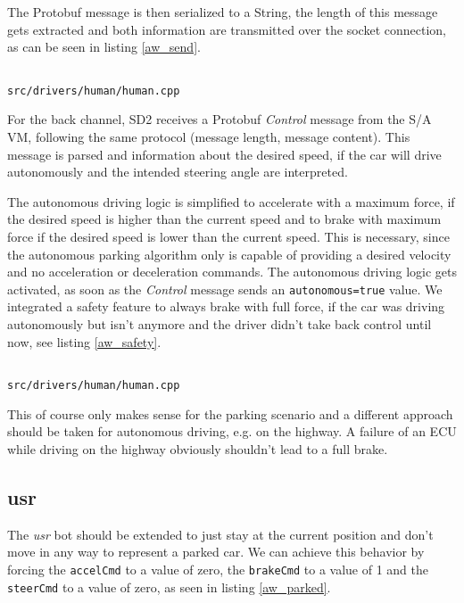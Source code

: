 \documentclass[paper=a4, fontsize=11pt]{scrreprt}
\begin{document}
The Protobuf message is then serialized to a String,
the length of this message gets extracted
and both information are transmitted over the socket connection,
as can be seen in listing \ref{aw_send}.

\begin{listing}[ht]
  \inputminted[firstline=352,linenos=true,lastline=363,gobble=4]{c++}{../../../simulators/speed-dreams/src/drivers/human/human.cpp}
  \caption{\texttt{src/drivers/human/human.cpp}}\label{aw_send}
\end{listing}

For the back channel, SD2 receives a Protobuf \textit{Control} message from the S/A VM,
following the same protocol (message length, message content).
This message is parsed and information about the desired speed,
if the car will drive autonomously and the intended steering angle are interpreted.

The autonomous driving logic is simplified to accelerate with a maximum force,
if the desired speed is higher than the current speed
and to brake with maximum force if the desired speed is lower than the current speed.
This is necessary,
since the autonomous parking algorithm only is capable of providing a desired velocity
and no acceleration or deceleration commands.
The autonomous driving logic gets activated,
as soon as the \textit{Control} message sends an \texttt{autonomous=true} value.
We integrated a safety feature to always brake with full force,
if the car was driving autonomously but isn't anymore
and the driver didn't take back control until now, see listing \ref{aw_safety}.

\begin{listing}[ht]
  \inputminted[firstline=422,linenos=true,lastline=426,gobble=6]{c++}{../../../simulators/speed-dreams/src/drivers/human/human.cpp}
  \caption{\texttt{src/drivers/human/human.cpp}}\label{aw_safety}
\end{listing}

This of course only makes sense for the parking scenario
and a different approach should be taken for autonomous driving, e.g. on the highway.
A failure of an ECU while driving on the highway obviously shouldn't lead to a full brake.

\subsection{usr}
The \textit{usr} bot should be extended to just stay at the current position
and don't move in any way to represent a parked car.
We can achieve this behavior by forcing the \texttt{accelCmd} to a value of zero,
the \texttt{brakeCmd} to a value of 1 and the \texttt{steerCmd} to a value of zero,
as seen in listing \ref{aw_parked}.
\end{document}
